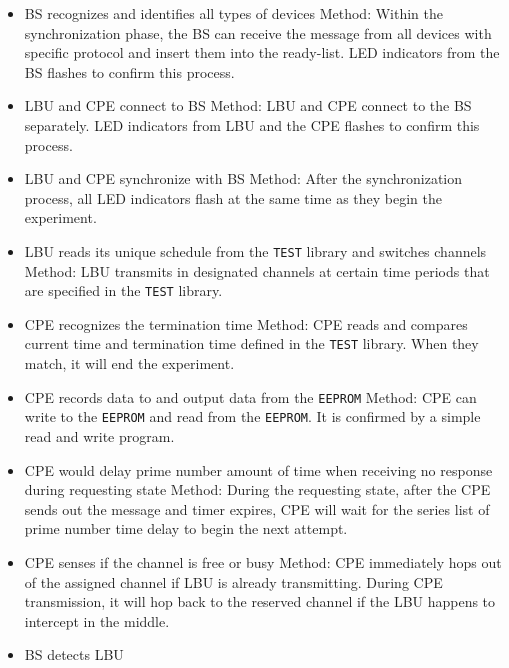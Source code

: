 \begin{itemize}
  \item BS recognizes and identifies all types of devices\newline
  Method: Within the synchronization phase, the BS can receive the message from all devices with specific protocol and insert them into the ready-list. LED indicators from the BS flashes to confirm this process.
  \item LBU and CPE connect to BS \newline
  Method: LBU and CPE connect to the BS separately. LED indicators from LBU and the CPE flashes to confirm this process.
  \item LBU and CPE synchronize with BS\newline
  Method: After the synchronization process, all LED indicators flash at the same time as they begin the experiment.
  \item LBU reads its unique schedule from the \texttt{TEST} library and switches channels\newline
  Method: LBU transmits in designated channels at certain time periods that are specified in the \texttt{TEST} library.
  \item CPE recognizes the termination time\newline
  Method: CPE reads and compares current time and termination time defined in the \texttt{TEST} library. When they match, it will end the experiment.
  \item CPE records data to and output data from the \texttt{EEPROM}\newline
  Method: CPE can write to the \texttt{EEPROM} and read from the \texttt{EEPROM}. It is confirmed by a simple read and write program.
  \item CPE would delay prime number amount of time when receiving no response during requesting state\newline
  Method: During the requesting state, after the CPE sends out the message and timer expires, CPE will wait for the series list of prime number time delay to begin the next attempt.
  \item CPE senses if the channel is free or busy\newline
  Method: CPE immediately hops out of the assigned channel if LBU is already transmitting. During CPE transmission, it will hop back to the reserved channel if the LBU happens to intercept in the middle.
  \item BS detects LBU\newline

\end{itemize}
